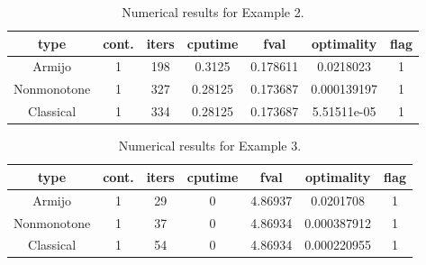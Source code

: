 \documentclass[a4paper]{article}
\newcommand{\mr}{\mathbb{R}}
\newcommand{\co}[1]{{\con{#1}}}
\begin{document}
  
  \begin{table}[p]
    \centering
    \begin{tabular}{cc|ccccc}
      \hline
      type & cont. & iters & cputime & 
      fval & optimality & flag \\ \hline
      Armijo & 1 & 198 & 0.3125 & 0.178611 & 0.0218023 & 1 \\
      Nonmonotone & 1 & 327 & 0.28125 & 0.173687 & 0.000139197 & 1 \\
      Classical & 1 & 334 & 0.28125 & 0.173687 & 5.51511e-05 & 1 \\
      \hline
    \end{tabular}
    \caption{Numerical results for Example 2.}
    \label{tab2}
  \end{table}

  
  
  
  \begin{table}[p]
    \centering
    \begin{tabular}{cc|ccccc}
      \hline
      type & cont. & iters & cputime & 
      fval & optimality & flag \\ \hline
      Armijo & 1 & 29 & 0 & 4.86937 & 0.0201708 & 1 \\
      Nonmonotone & 1 & 37 & 0 & 4.86934 & 0.000387912 & 1 \\
      Classical & 1 & 54 & 0 & 4.86934 & 0.000220955 & 1 \\
      \hline
    \end{tabular}
    \caption{Numerical results for Example 3.}
    \label{tab3}
  \end{table}


\end{document}
